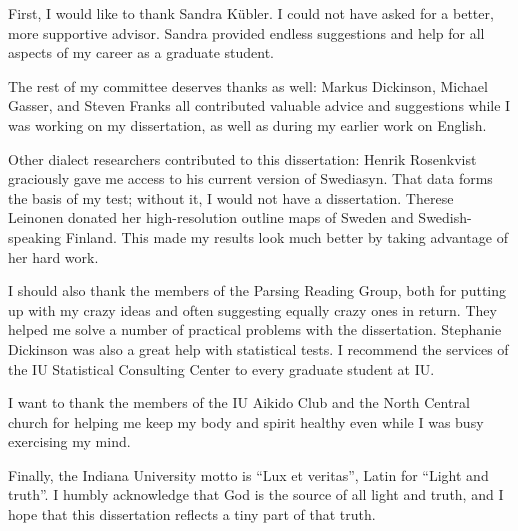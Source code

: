 First, I would like to thank Sandra K\"ubler. I could not have asked
for a better, more supportive advisor. Sandra provided endless
suggestions and help for all aspects of my career as a graduate
student.

The rest of my committee deserves thanks as well: Markus Dickinson,
Michael Gasser, and Steven Franks all contributed valuable advice and
suggestions while I was working on my dissertation, as well as during
my earlier work on English.

Other dialect researchers contributed to this dissertation: Henrik
Rosenkvist graciously gave me access to his current version of
Swediasyn. That data forms the basis of my test; without it, I would
not have a dissertation. Therese Leinonen donated her
high-resolution outline maps of Sweden and Swedish-speaking
Finland. This made my results look much better by taking advantage of
her hard work.

I should also thank the members of the Parsing Reading Group, both for
putting up with my crazy ideas and often suggesting equally crazy ones
in return. They helped me solve a number of practical problems with
the dissertation. Stephanie Dickinson was also a great help with
statistical tests. I recommend the services of the IU Statistical
Consulting Center to every graduate student at IU.

I want to thank the members of the IU Aikido Club and the North
Central church for helping me keep my body and spirit healthy
even while I was busy exercising my mind.

Finally, the Indiana University motto is ``Lux et veritas'', Latin for
``Light and truth''. I humbly acknowledge that God is the source of
all light and truth, and I hope that this dissertation reflects
a tiny part of that truth.



